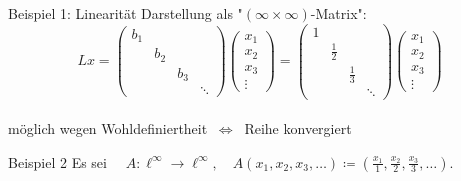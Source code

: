\documentclass[AERbeamer%
,optBeamerClassicFormat%
,optLeftEquations   %
]{AERlatex}
\begin{document}
%
    \begin{frame}{Beispiel 1: Linearität}
        Darstellung als "$(\infty \times \infty)$-Matrix":
        \begin{equation*}
            Lx = \left(\begin{array}{llll}
                           b_1 &     &     &        \\
                           & b_2 &     &        \\
                           &     & b_3 &        \\
                           &     &     & \ddots
            \end{array}\right)
            \left(\begin{array}{c}
                      x_1 \\
                      x_2 \\
                      x_3 \\
                      \vdots
            \end{array}\right) =
            \left(\begin{array}{llll}
                      1 &             &             &        \\
                      & \frac{1}{2} &             &        \\
                      &             & \frac{1}{3} &        \\
                      &             &             & \ddots
            \end{array}\right)
            \left(\begin{array}{c}
                      x_1 \\
                      x_2 \\
                      x_3 \\
                      \vdots
            \end{array}\right)
        \end{equation*} \\ \pause
        möglich wegen Wohldefiniertheit $~\Leftrightarrow~$ Reihe konvergiert
    \end{frame}
%
    \begin{frame}{Beispiel 2}
        \setlength{\baselineskip}{1.6\baselineskip}
        Es sei $\quad A: \ell^{\infty} \rightarrow \ell^{\infty}, \quad A\left(x_1, x_2, x_3, \ldots\right)\coloneqq\left(\frac{x_1}{1}, \frac{x_2}{2}, \frac{x_3}{3}, \ldots\right)$.
    \end{frame}
\end{document}
